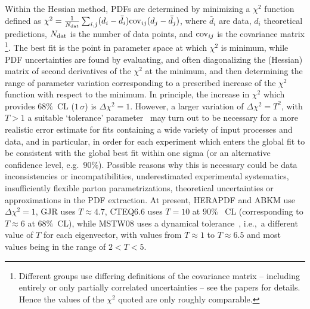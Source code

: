 Within the Hessian method, PDFs are determined by minimizing a
$\chi^2$ function defined as
  $\chi^2=\frac{1}{N_{\rm dat}}\sum_{i,j}
  (d_i-\bar d_i){\rm cov}_{ij}(d_j-\bar d_j)$, where $\bar d_i$ are data,
  $d_i$ theoretical predictions, ${N_{\rm dat}}$
  is the number of data points,
and ${\rm cov}_{ij}$ is
  the covariance matrix%
\footnote{Different groups use differing
  definitions of the covariance matrix -- including entirely or only
  partially correlated uncertainties -- see the papers for details. 
  Hence the values of the $\chi^2$
  quoted are only roughly comparable.}. 
The best fit is the point in parameter
space at which $\chi^2$ is minimum, while PDF uncertainties are found
by evaluating, and often diagonalizing the (Hessian) matrix of second
derivatives of the $\chi^2$ at the minimum, and then 
determining the range of parameter variation 
corresponding to a  prescribed
increase of the $\chi^2$ function with respect to the minimum.
In principle, the increase in $\chi^2$ which provides
$68\%$~CL  ($1 \,\sigma$) is $\Delta\chi^2=1$.  However, a larger variation
of $\Delta\chi^2=T^2$, with $T>1$  a suitable `tolerance'
 parameter~\cite{Stump:2001gu,Pumplin:2001ct,Martin:2002aw} may
turn out to be necessary for a more realistic error estimate for fits
containing a wide variety of input processes and data, and 
in particular, in order for each
 experiment which enters the global fit to be consistent
 with the global best fit within one sigma (or an alternative
 confidence level, 
e.g.\ $90\%$).  Possible reasons why this is necessary could be 
data inconsistencies or incompatibilities, 
underestimated experimental systematics, insufficiently flexible
parton parametrizations, theoretical uncertainties or approximations in
the PDF extraction. At present, HERAPDF and ABKM use $\Delta\chi^2=1$,
GJR uses $T\approx4.7$, CTEQ6.6
uses $T=10$ at $90\%$ ~CL (corresponding to $T\approx6$ at $68\%$~CL), while MSTW08 uses a dynamical tolerance~\cite{Martin:2009iq}, i.e.,\ a different value
of $T$ for each eigenvector, with values 
from $T\approx 1$ to
$T\approx 6.5$ and most values being in the range of $2<T<5$. 

